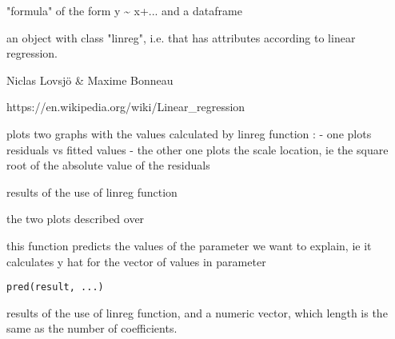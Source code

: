 \documentclass[a4paper]{book}
\begin{document}
%
\begin{Arguments}
\begin{ldescription}
\item[\code{a}] "formula" of the form y \textasciitilde{} x+... and a dataframe
\end{ldescription}
\end{Arguments}
%
\begin{Value}
an object with class "linreg", i.e. that has attributes according to linear regression.
\end{Value}
%
\begin{Author}\relax
Niclas Lovsjö \& Maxime Bonneau
\end{Author}
%
\begin{References}\relax
https://en.wikipedia.org/wiki/Linear\_regression
\end{References}
%
\begin{Description}\relax
plots two graphs with the values calculated by linreg function :
- one plots residuals vs fitted values
- the other one plots the scale location, ie the square root of the
absolute value of the residuals
\end{Description}
%
\begin{Arguments}
\begin{ldescription}
\item[\code{what}] results of the use of linreg function
\end{ldescription}
\end{Arguments}
%
\begin{Value}
the two plots described over
\end{Value}
%
\begin{Description}\relax
this function predicts the values of the parameter we want to explain,
ie it calculates y hat for the vector of values in parameter
\end{Description}
%
\begin{Usage}
\begin{verbatim}
pred(result, ...)
\end{verbatim}
\end{Usage}
%
\begin{Arguments}
\begin{ldescription}
\item[\code{what}] results of the use of linreg function, and a numeric vector, which length is the
same as the number of coefficients.
\end{ldescription}
\end{Arguments}
\end{document}
